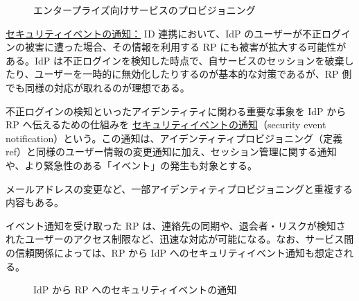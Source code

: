 \documentclass[uplatex]{jsarticle}
\def\ref#1{ref}%
\def\label#1{}%
\begin{document}
\begin{figure}[H]
\centering
{}
\caption{エンタープライズ向けサービスのプロビジョニング}
\label{fig:ch4-enterprise-provisioning}
\end{figure}

\underline{セキュリティイベントの通知：}
ID 連携において、IdP のユーザーが不正ログインの被害に遭った場合、その情報を利用する RP にも被害が拡大する可能性がある。IdP は不正ログインを検知した時点で、自サービスのセッションを破棄したり、ユーザーを一時的に無効化したりするのが基本的な対策であるが、RP 側でも同様の対応が取れるのが理想である。

\begin{dfn}[セキュリティイベントの通知]\label{dfn:security-event-notification}
不正ログインの検知といったアイデンティティに関わる重要な事象を IdP から RP へ伝えるための仕組みを \underline{セキュリティイベントの通知}（security event notification）という。この通知は、アイデンティティプロビジョニング（定義 \ref{dfn:identity-provisioning}）と同様のユーザー情報の変更通知に加え、セッション管理に関する通知や、より緊急性のある「イベント」の発生も対象とする。
\end{dfn}

メールアドレスの変更など、一部アイデンティティプロビジョニングと重複する内容もある。

イベント通知を受け取った RP は、連絡先の同期や、退会者・リスクが検知されたユーザーのアクセス制限など、迅速な対応が可能になる。なお、サービス間の信頼関係によっては、RP から IdP へのセキュリティイベント通知も想定される。

\begin{figure}[H]
\centering
{}
\caption{IdP から RP へのセキュリティイベントの通知}
\label{fig:ch4-security-event-notification}
\end{figure}
\end{document}
